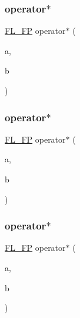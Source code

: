 \mbox{\label{class_f_l___f_p_a7c9e13210a3e8f9ef270a4895b1fc0d3}} 
\subsubsection{\texorpdfstring{operator$\ast$}{operator*}\hspace{0.1cm}{\footnotesize\ttfamily [1/3]}}
{\footnotesize\ttfamily \hyperlink{class_f_l___f_p}{F\+L\+\_\+\+FP} operator$\ast$ (\begin{DoxyParamCaption}\item[{const \hyperlink{class_f_l___f_p}{F\+L\+\_\+\+FP} \&}]{a,  }\item[{const \hyperlink{class_f_l___f_p}{F\+L\+\_\+\+FP} \&}]{b }\end{DoxyParamCaption})\hspace{0.3cm}{\ttfamily [friend]}}

\mbox{\label{class_f_l___f_p_a4d88f005bc60cbdceb070335a94a068a}} 
\subsubsection{\texorpdfstring{operator$\ast$}{operator*}\hspace{0.1cm}{\footnotesize\ttfamily [2/3]}}
{\footnotesize\ttfamily \hyperlink{class_f_l___f_p}{F\+L\+\_\+\+FP} operator$\ast$ (\begin{DoxyParamCaption}\item[{const \hyperlink{class_f_l___f_p}{F\+L\+\_\+\+FP} \&}]{a,  }\item[{const double \&}]{b }\end{DoxyParamCaption})\hspace{0.3cm}{\ttfamily [friend]}}

\mbox{\label{class_f_l___f_p_a248f294ecf7ddc53650ef72b848e6bb5}} 
\subsubsection{\texorpdfstring{operator$\ast$}{operator*}\hspace{0.1cm}{\footnotesize\ttfamily [3/3]}}
{\footnotesize\ttfamily \hyperlink{class_f_l___f_p}{F\+L\+\_\+\+FP} operator$\ast$ (\begin{DoxyParamCaption}\item[{const double \&}]{a,  }\item[{const \hyperlink{class_f_l___f_p}{F\+L\+\_\+\+FP} \&}]{b }\end{DoxyParamCaption})\hspace{0.3cm}{\ttfamily [friend]}}

